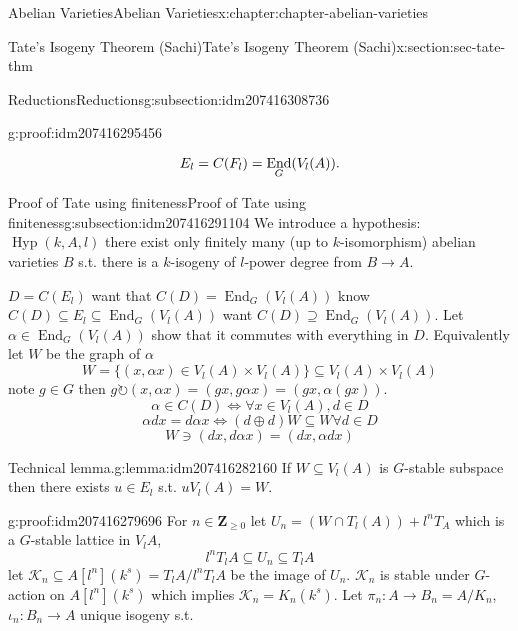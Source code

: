 \documentclass[oneside,10pt,]{book}
\newcommand{\qedhere}{\relax}
\numberwithin{equation}{section}
\newcommand{\lb}{[}
\newcommand{\rb}{]}
\newcommand{\ZZ}{\mathbf{Z}}
\newcommand{\acts}{\circlearrowright}
\DeclareMathOperator{\End}{End}
\begin{document}
\begin{chapterptx}{Abelian Varieties}{}{Abelian Varieties}{}{}{x:chapter:chapter-abelian-varieties}
\begin{sectionptx}{Tate's Isogeny Theorem (Sachi)}{}{Tate's Isogeny Theorem (Sachi)}{}{}{x:section:sec-tate-thm}
\begin{subsectionptx}{Reductions}{}{Reductions}{}{}{g:subsection:idm207416308736}
\begin{proofptx}{}{g:proof:idm207416295456}
\begin{enumerate}
\begin{equation*}
E_l = C(F_l) = \End_G(V_l(A))\text{.}\qedhere
\end{equation*}
%
\end{enumerate}
%
\end{proofptx}
\end{subsectionptx}
%
%
\typeout{************************************************}
\typeout{************************************************}
%
\begin{subsectionptx}{Proof of Tate using finiteness}{}{Proof of Tate using finiteness}{}{}{g:subsection:idm207416291104}
We introduce a hypothesis: \(\operatorname{Hyp}(k,A,l)\) there exist only finitely many (up to \(k\)-isomorphism) abelian varieties \(B\) s.t. there is a \(k\)-isogeny of \(l\)-power degree from \(B\to A\).%
\par
\(D =C(E_l)\) want that \(C(D) = \End_G(V_l(A))\) know \(C(D) \subseteq E_l \subseteq \End_G(V_l(A))\) want \(C(D) \supseteq \End_G(V_l(A))\). Let \(\alpha \in \End_G(V_l(A))\) show that it commutes with everything in \(D\). Equivalently let \(W\) be the graph of \(\alpha\)%
\begin{equation*}
W = \{(x,\alpha x) \in V_l(A)\times V_l(A)\} \subseteq V_l(A)\times V_l(A)
\end{equation*}
note \(g\in G\) then \(g\acts (x,\alpha x) = (gx,g\alpha x ) = (gx, \alpha(gx))\).%
\begin{equation*}
\alpha\in C(D) \iff \forall x\in V_l(A), d\in D
\end{equation*}
%
\begin{equation*}
\alpha d x = d\alpha x \iff (d\oplus d)W \subseteq W \forall d\in D
\end{equation*}
%
\begin{equation*}
W\ni (dx, d\alpha x) = (dx, \alpha d x)
\end{equation*}
%
\begin{lemma}{Technical lemma.}{}{g:lemma:idm207416282160}%
If \(W\subseteq V_l(A)\) is \(G\)-stable subspace then there exists \(u\in E_l\) s.t. \(u V_l(A) = W\).%
\end{lemma}
\begin{proofptx}{}{g:proof:idm207416279696}
For \(n \in \ZZ_{\ge 0}\) let \(U_n = (W\cap T_l(A)) + l^n T_A\) which is a \(G\)-stable lattice in \(V_l A\),%
\begin{equation*}
l^nT_lA \subseteq U_n \subseteq T_l A
\end{equation*}
let \(\mathcal K_n \subseteq A\lb l^n \rb (k^s) = T_l A/ l^n T_l A\) be the image of \(U_n\). \(\mathcal K_n\) is stable under \(G\)-action on \(A\lb l^n \rb (k^s)\) which implies \(\mathcal K_n = K_n (k^s)\). Let \(\pi_n \colon A \to B_n = A/ K_n\), \(\iota_n \colon B_n \to A\) unique isogeny s.t.%

\end{proofptx}
\end{subsectionptx}
\end{sectionptx}
\end{chapterptx}
\end{document}
